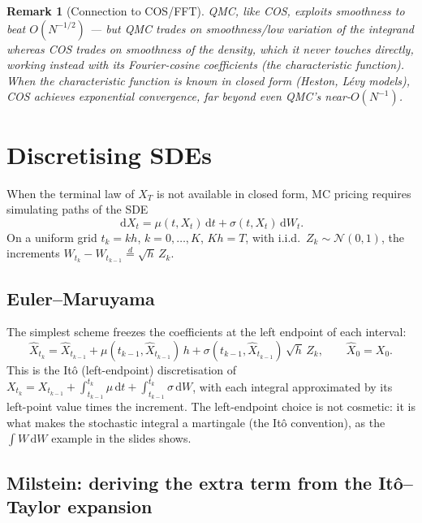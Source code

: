 \documentclass[11pt]{article}
\newcommand{\dd}{\,\mathrm{d}}
\newtheorem{remark}{Remark}
\begin{document}
\begin{remark}[Connection to COS/FFT]
QMC, like COS, exploits \emph{smoothness} to beat $O(N^{-1/2})$ --- but QMC trades on
smoothness/low variation of the integrand whereas COS trades on smoothness of the
\emph{density}, which it never touches directly, working instead with its Fourier-cosine
coefficients (the characteristic function). When the characteristic function is known in
closed form (Heston, Lévy models), COS achieves exponential convergence, far beyond
even QMC's near-$O(N^{-1})$.
\end{remark}

\section{Discretising SDEs}

When the terminal law of $X_T$ is not available in closed form, MC pricing requires
simulating paths of the SDE
\[
\dd X_t=\mu(t,X_t)\dd t+\sigma(t,X_t)\dd W_t.
\]
On a uniform grid $t_k=kh$, $k=0,\dots,K$, $Kh=T$, with i.i.d.\ $Z_k\sim\mathcal N(0,1)$,
the increments $W_{t_k}-W_{t_{k-1}}\stackrel{d}{=}\sqrt h\,Z_k$.

\subsection{Euler--Maruyama}

The simplest scheme freezes the coefficients at the left endpoint of each interval:
\[
\widehat X_{t_k}=\widehat X_{t_{k-1}}+\mu(t_{k-1},\widehat X_{t_{k-1}})\,h
+\sigma(t_{k-1},\widehat X_{t_{k-1}})\,\sqrt h\,Z_k,
\qquad \widehat X_0=X_0.
\]
This is the Itô (left-endpoint) discretisation of
$X_{t_k}=X_{t_{k-1}}+\int_{t_{k-1}}^{t_k}\mu\dd t+\int_{t_{k-1}}^{t_k}\sigma\dd W$,
with each integral approximated by its left-point value times the increment. The
left-endpoint choice is not cosmetic: it is what makes the stochastic integral a
martingale (the Itô convention), as the $\int W\dd W$ example in the slides shows.

\subsection{Milstein: deriving the extra term from the Itô--Taylor expansion}
\end{document}
